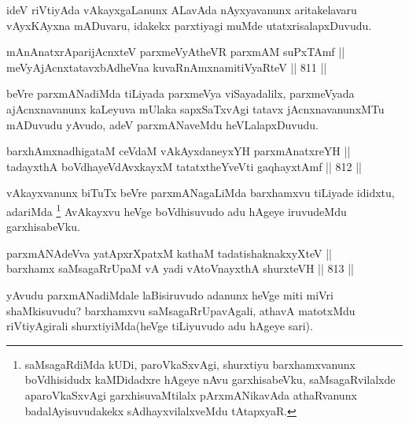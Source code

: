 \begin{artha}
ideV riVtiyAda vAkayxgaLanunx ALavAda nAyxyavanunx aritakelavaru vAyxKAyxna mADuvaru, idakekx parxtiyagi muMde utatxrisalapxDuvudu.
\end{artha}


\begin{shl}
mAnAnatxrAparijAcnxteV parxmeVyAtheVR parxmAM suPxTAmf || \\
meVyAjAcnxtatavxbAdheVna kuvaRnAmxnamitiVyaRteV \hfill || 811 ||  
\end{shl}

\begin{artha}
beVre parxmANadiMda tiLiyada parxmeVya viSayadalilx, parxmeVyada ajAcnxnavanunx kaLeyuva mUlaka sapxSaTxvAgi tatavx jAcnxnavanunxMTu mADuvudu yAvudo, adeV parxmANaveMdu heVLalapxDuvudu.
\end{artha}


\begin{shl}
barxhAmxnadhigataM ceVdaM vAkAyxdaneyxYH parxmAnatxreYH || \\
tadayxthA boVdhayeVdAvxkayxM tatatxtheYveVti gaqhayxtAmf \hfill || 812 ||  
\end{shl}

\begin{artha}
vAkayxvanunx biTuTx beVre parxmANagaLiMda barxhamxvu tiLiyade ididxtu, adariMda \footnote{saMsagaRdiMda kUDi, paroVkaSxvAgi, shurxtiyu barxhamxvanunx boVdhisidudx kaMDidadxre hAgeye nAvu garxhisabeVku, saMsagaRvilalxde aparoVkaSxvAgi garxhisuvaMtilalx pArxmANikavAda athaRvanunx badalAyisuvudakekx sAdhayxvilalxveMdu tAtapxyaR.} AvAkayxvu heVge boVdhisuvudo adu hAgeye iruvudeMdu garxhisabeVku.
\end{artha}


\begin{shl}
parxmANAdeVva yatApxrXpatxM kathaM tadatishaknakxyXteV || \\
barxhamx saMsagaRrUpaM vA yadi vA\s toV\s nayxthA shurxteVH \hfill || 813 ||  
\end{shl}

\begin{artha}
yAvudu parxmANadiMdale laBisiruvudo adanunx heVge miti miVri shaMkisuvudu? barxhamxvu saMsagaRrUpavAgali, athavA matotxMdu riVtiyAgirali shurxtiyiMda(heVge tiLiyuvudo adu hAgeye sari).
\end{artha}

